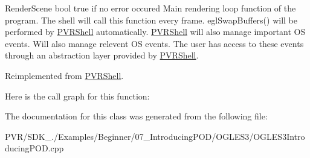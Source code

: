   Render\+Scene  bool true if no error occured  Main rendering loop function of the program. The shell will call this function every frame. egl\+Swap\+Buffers() will be performed by \hyperlink{class_p_v_r_shell}{P\+V\+R\+Shell} automatically. \hyperlink{class_p_v_r_shell}{P\+V\+R\+Shell} will also manage important O\+S events. Will also manage relevent O\+S events. The user has access to these events through an abstraction layer provided by \hyperlink{class_p_v_r_shell}{P\+V\+R\+Shell}. 

Reimplemented from \hyperlink{class_p_v_r_shell_ae0eb5f797cbe993a22b8659f9c332578}{P\+V\+R\+Shell}.



Here is the call graph for this function\+:




The documentation for this class was generated from the following file\+:\begin{DoxyCompactItemize}
\item 
P\+V\+R/\+S\+D\+K\+\_./\+Examples/\+Beginner/07\+\_\+\+Introducing\+P\+O\+D/\+O\+G\+L\+E\+S3/O\+G\+L\+E\+S3\+Introducing\+P\+O\+D.\+cpp\end{DoxyCompactItemize}
